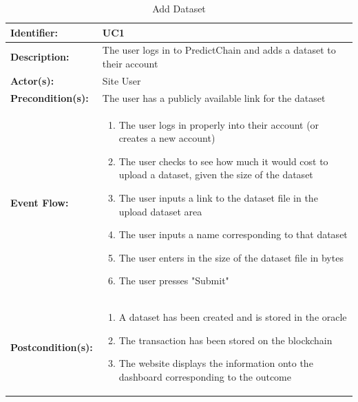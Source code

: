 \documentclass{ledger}
\begin{document}
\begin{table}[H]
    \caption{Add Dataset}
    \label{tab:add-ds}
    \centering
    \begin{tabular}{|p{3cm}|p{11cm}|}
        \hline
        \textbf{Identifier:} & UC1 \\
        \hline
        \textbf{Description:} & The user logs in to PredictChain and adds a dataset to their account\\
        \hline
        \textbf{Actor(s):} & Site User \\
        \hline
        \textbf{Precondition(s):} & The user has a publicly available link for the dataset\\
        \hline
        \textbf{Event Flow:} &
        \begin{enumerate}
            \item The user logs in properly into their account (or creates a new account)
            \item The user checks to see how much it would cost to upload a dataset, given the size of the dataset
            \item The user inputs a link to the dataset file in the upload dataset area
            \item The user inputs a name corresponding to that dataset
            \item The user enters in the size of the dataset file in bytes
            \item The user presses "Submit"
        \end{enumerate} \\
        \hline
        \textbf{Postcondition(s):} &
        \begin{enumerate}
            \item A dataset has been created and is stored in the oracle
            \item The transaction has been stored on the blockchain
            \item The website displays the information onto the dashboard corresponding to the outcome
        \end{enumerate}\\
        \hline
    \end{tabular}
\end{table}
\end{document}
